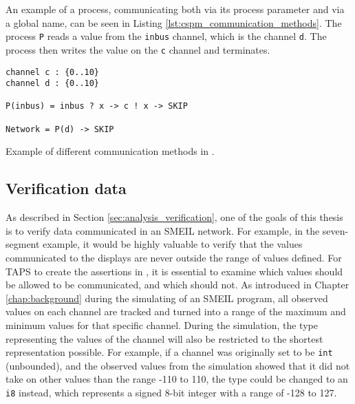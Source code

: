 An example of a \cspm{} process, communicating both via its process parameter and via a global name, can be seen in Listing \ref{lst:cspm_communication_methods}. The process \texttt{P} reads a value from the \texttt{inbus} channel, which is the channel \texttt{d}. The process then writes the value on the \texttt{c} channel and terminates.
\begin{listing}
\begin{verbatim}
channel c : {0..10}
channel d : {0..10}

P(inbus) = inbus ? x -> c ! x -> SKIP

Network = P(d) -> SKIP
\end{verbatim}
\caption{Example of different communication methods in \cspm{}.}
\label{lst:cspm_communication_methods}
\end{listing}
\subsection{Verification data}
As described in Section \ref{sec:analysis_verification}, one of the goals of this thesis is to verify data communicated in an SMEIL network. For example, in the seven-segment example, it would be highly valuable to verify that the values communicated to the displays are never outside the range of values defined. For TAPS to create the assertions in \cspm{}, it is essential to examine which values should be allowed to be communicated, and which should not.
As introduced in Chapter \ref{chap:background} during the simulating of an SMEIL program, all observed values on each channel are tracked and turned into a range of the maximum and minimum values for that specific channel. During the simulation, the type representing the values of the channel will also be restricted to the shortest representation possible. For example, if a channel was originally set to be \texttt{int} (unbounded), and the observed values from the simulation showed that it did not take on other values than the range -110 to 110, the type could be changed to an \texttt{i8} instead, which represents a signed 8-bit integer with a range of -128 to 127.\\

